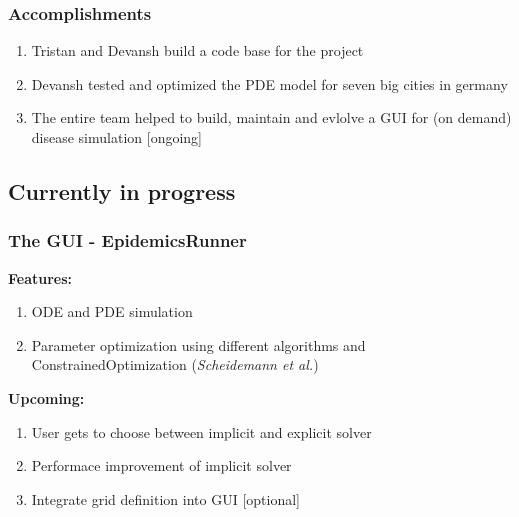 \documentclass{beamer}
\begin{document}
\begin{frame}
\frametitle{Accomplishments}
	\begin{enumerate}[$\bullet$]
		\item Tristan and Devansh build a code base for the project
		\item Devansh tested and optimized the PDE model for seven big cities in germany
		\item The entire team helped to build, maintain and evlolve a GUI for (on demand) disease simulation [ongoing]
	\end{enumerate}
\end{frame}


\subsection{Currently in progress}

\begin{frame}
\frametitle{The GUI - EpidemicsRunner} 
	\textbf{Features:}
	\begin{enumerate}[$\bullet$]
		\item ODE and PDE simulation
		\item Parameter optimization using different algorithms and ConstrainedOptimization (\textit{Scheidemann et al.})
	\end{enumerate}

	\textbf{Upcoming:}
	\begin{enumerate}[$\bullet$]
		\item User gets to choose between implicit and explicit solver
		\item Performace improvement of implicit solver
		\item Integrate grid definition into GUI [optional]
	\end{enumerate}
\end{frame}
\end{document}
